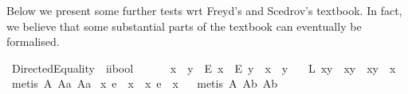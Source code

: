 \begin{isabellebody}
\begin{isamarkuptext}
Below we present some further tests wrt Freyd's and Scedrov's textbook. In fact, we believe
that some substantial parts of the textbook can eventually be formalised.%
\end{isamarkuptext}%
\isamarkuptrue%
\isamarkupfalse%
\ DirectedEquality\ {\isacharcolon}{\isacharcolon}\ {\isachardoublequoteopen}i{\isasymRightarrow}i{\isasymRightarrow}bool{\isachardoublequoteclose}\ {\isacharparenleft}\ {\isachardoublequoteopen}{\isasymgreaterapprox}{\isachardoublequoteclose}\ {}{}{\isacharparenright}\ \isanewline
\ \ {\isachardoublequoteopen}x\ {\isasymgreaterapprox}\ y\ {\isasymequiv}\ {\isacharparenleft}{\isacharparenleft}\isactrlbold E\ x{\isacharparenright}\ \isactrlbold {\isasymrightarrow}\ {\isacharparenleft}\isactrlbold E\ y{\isacharparenright}{\isacharparenright}\ \isactrlbold {\isasymand}\ x\ \isactrlbold {\isacharequal}\ y{\isachardoublequoteclose}\ \ \isanewline
\isanewline
{}\isamarkupfalse%
\ L{}{\isacharunderscore}{}{}{\isacharcolon}\ {\isachardoublequoteopen}{\isacharparenleft}{\isacharparenleft}{\isasymbox}{\isacharparenleft}x{\isasymcdot}y{\isacharparenright}{\isacharparenright}\ {\isasymapprox}\ {\isacharparenleft}{\isasymbox}{\isacharparenleft}x{\isasymcdot}{\isacharparenleft}{\isasymbox}y{\isacharparenright}{\isacharparenright}{\isacharparenright}{\isacharparenright}\ \isactrlbold {\isasymleftrightarrow}\ {\isacharparenleft}{\isacharparenleft}{\isasymbox}{\isacharparenleft}x{\isasymcdot}y{\isacharparenright}{\isacharparenright}\ {\isasymgreaterapprox}\ {\isasymbox}x{\isacharparenright}{\isachardoublequoteclose}\ \isanewline
%
\isadelimproof
%
\endisadelimproof
%
\isatagproof
{}\isamarkupfalse%
\ {\isacharparenleft}metis\ A{}\ A{}a\ A{}a{\isacharparenright}%
\endisatagproof
{\isafoldproof}%
%
\isadelimproof
\isanewline
%
\endisadelimproof
\isanewline
{}\isamarkupfalse%
\ {\isachardoublequoteopen}{\isacharparenleft}\isactrlbold {\isasymexists}x{\isachardot}\ e\ {\isasymapprox}\ {\isacharparenleft}{\isasymbox}x{\isacharparenright}{\isacharparenright}\ \isactrlbold {\isasymleftrightarrow}\ {\isacharparenleft}\isactrlbold {\isasymexists}x{\isachardot}\ e\ {\isasymapprox}\ {\isacharparenleft}x{\isasymbox}{\isacharparenright}{\isacharparenright}{\isachardoublequoteclose}%
\isadelimproof
\ %
\endisadelimproof
%
\isatagproof
{}\isamarkupfalse%
\ {\isacharparenleft}metis\ A{}\ A{}b\ A{}b{\isacharparenright}%

\end{isabellebody}
